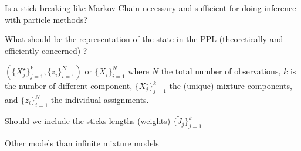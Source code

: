 Is a stick-breaking-like Markov Chain necessary and sufficient for doing inference with particle methods?

What should be the representation of the state in the PPL (theoretically and efficiently concerned) ?

$(\{X_j^\star\}_{j=1}^k, \{z_i\}_{i=1}^N)$ or $\{X_i\}_{i=1}^N$
where $N$ the total number of observations, $k$ is the number of different component, $\{X_j^\star\}_{j=1}^k$ the (unique) mixture components, and $\{z_i\}_{i=1}^N$ the individual assignments.

Should we include the sticks lengths (weights) $\{\tilde{J}_j\}_{j=1}^k$

Other models than infinite mixture models  

